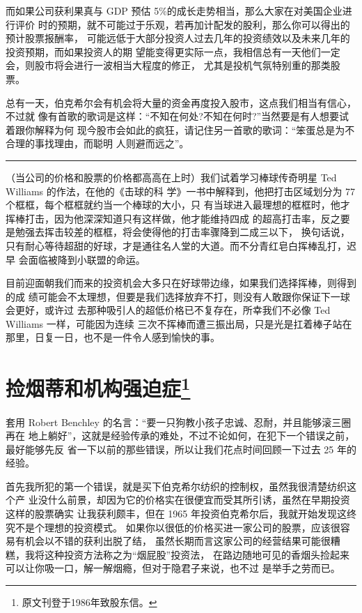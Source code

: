\documentclass[UTF8,a4paper,zihao=-4,fontset = windows]{ctexart} %
\begin{document}
而如果公司获利果真与 GDP 预估 5\%的成长走势相当，那么大家在对美国企业进行评价
时的预期，就不可能过于乐观，若再加计配发的股利，那么你可以得出的预计股票报酬率，
可能远低于大部分投资人过去几年的投资绩效以及未来几年的投资预期，而如果投资人的期
望能变得更实际一点，我相信总有一天他们一定会，则股市将会进行一波相当大程度的修正，
尤其是投机气氛特别重的那类股票。

总有一天，伯克希尔会有机会将大量的资金再度投入股市，这点我们相当有信心，不过就
像有首歌的歌词是这样：“不知在何处?不知在何时?”当然要是有人想要试着跟你解释为何
现今股市会如此的疯狂，请记住另一首歌的歌词：“笨蛋总是为不合理的事找理由，而聪明
人则避而远之”。

\rule{10cm}{0.4pt}

（当公司的价格和股票的价格都高高在上时）我们试着学习棒球传奇明星 Ted Williams 的作法，在他的《击球的科
学》一书中解释到，他把打击区域划分为 77 个框框，每个框框就约当一个棒球的大小，只
有当球进入最理想的框框时，他才挥棒打击，因为他深深知道只有这样做，他才能维持四成
的超高打击率，反之要是勉强去挥击较差的框框，将会使得他的打击率骤降到二成三以下，
换句话说，只有耐心等待超甜的好球，才是通往名人堂的大道。而不分青红皂白挥棒乱打，迟早
会面临被降到小联盟的命运。

目前迎面朝我们而来的投资机会大多只在好球带边缘，如果我们选择挥棒，则得到的成
绩可能会不太理想，但要是我们选择放弃不打，则没有人敢跟你保证下一球会更好，或许过
去那种吸引人的超低价格已不复存在，所幸我们不必像 Ted Williams 一样，可能因为连续
三次不挥棒而遭三振出局，只是光是扛着棒子站在那里，日复一日，也不是一件令人感到愉快的事。

\section[捡烟蒂和机构强迫症]{捡烟蒂和机构强迫症\footnote{原文刊登于1986年致股东信。}}

套用 Robert Benchley 的名言：“要一只狗教小孩子忠诚、忍耐，并且能够滚三圈再在
地上躺好”，这就是经验传承的难处，不过不论如何，在犯下一个错误之前，最好能够先反
省一下以前的那些错误，所以让我们花点时间回顾一下过去 25 年的经验。

首先我所犯的第一个错误，就是买下伯克希尔纺织的控制权，虽然我很清楚纺织这个产
业没什么前景，却因为它的价格实在很便宜而受其所引诱，虽然在早期投资这样的股票确实
让我获利颇丰，但在 1965 年投资伯克希尔后，我就开始发现这终究不是个理想的投资模式。
如果你以很低的价格买进一家公司的股票，应该很容易有机会以不错的获利出脱了结，
虽然长期而言这家公司的经营结果可能很糟糕，我将这种投资方法称之为“烟屁股”投资法，
在路边随地可见的香烟头捡起来可以让你吸一口，解一解烟瘾，但对于隐君子来说，也不过
是举手之劳而已。
\end{document}
